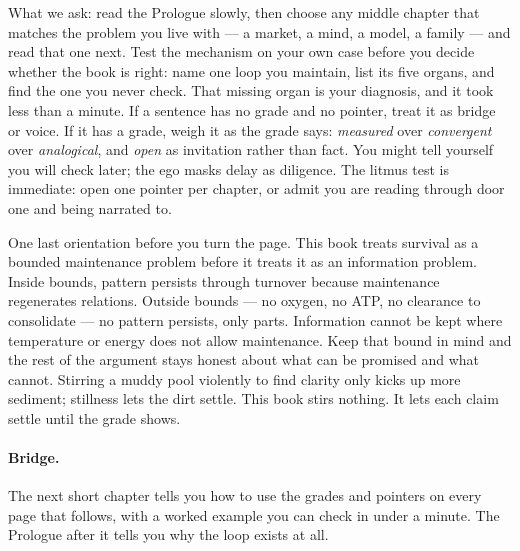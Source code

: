 What we ask: read the Prologue slowly, then choose any middle chapter that matches the problem you live with --- a market, a mind, a model, a family --- and read that one next. Test the mechanism on your own case before you decide whether the book is right: name one loop you maintain, list its five organs, and find the one you never check. That missing organ is your diagnosis, and it took less than a minute. If a sentence has no grade and no pointer, treat it as bridge or voice. If it has a grade, weigh it as the grade says: \textit{measured} over \textit{convergent} over \textit{analogical}, and \textit{open} as invitation rather than fact. You might tell yourself you will check later; the ego masks delay as diligence. The litmus test is immediate: open one pointer per chapter, or admit you are reading through door one and being narrated to.

One last orientation before you turn the page. This book treats survival as a bounded maintenance problem before it treats it as an information problem. Inside bounds, pattern persists through turnover because maintenance regenerates relations. Outside bounds --- no oxygen, no ATP, no clearance to consolidate --- no pattern persists, only parts. Information cannot be kept where temperature or energy does not allow maintenance. Keep that bound in mind and the rest of the argument stays honest about what can be promised and what cannot. Stirring a muddy pool violently to find clarity only kicks up more sediment; stillness lets the dirt settle. This book stirs nothing. It lets each claim settle until the grade shows.

\paragraph{Bridge.} The next short chapter tells you how to use the grades and pointers on every page that follows, with a worked example you can check in under a minute. The Prologue after it tells you why the loop exists at all.
